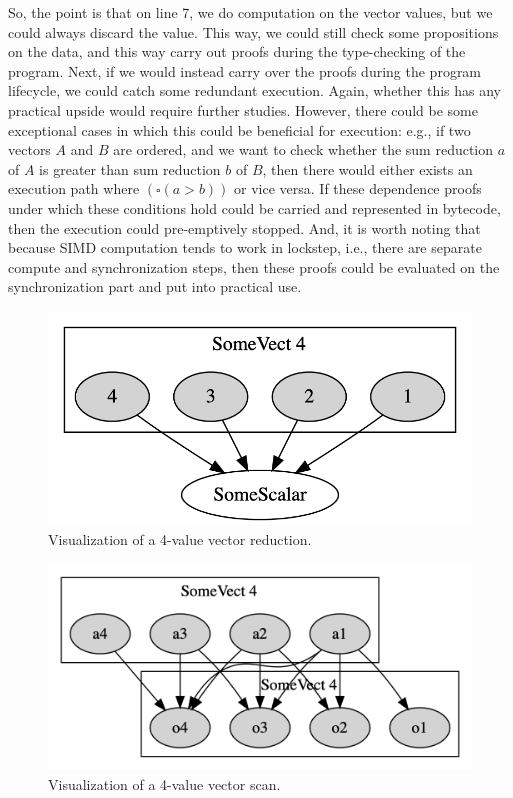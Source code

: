 \documentclass{report}
\begin{document}
So, the point is that on line 7, we do computation on the vector values, but we could always discard the value. This way, we could still check some propositions on the data, and this way carry out proofs during the type-checking of the program. Next, if we would instead carry over the proofs during the program lifecycle, we could catch some redundant execution. Again, whether this has any practical upside would require further studies. However, there could be some exceptional cases in which this could be beneficial for execution: e.g., if two vectors $A$ and $B$ are ordered, and we want to check whether the sum reduction $a$ of $A$ is greater than sum reduction $b$ of $B$, then there would either exists an execution path where $(\square (a>b))$ or vice versa. If these dependence proofs under which these conditions hold could be carried and represented in bytecode, then the execution could pre-emptively stopped. And, it is worth noting that because SIMD computation tends to work in lockstep, i.e., there are separate compute and synchronization steps, then these proofs could be evaluated on the synchronization part and put into practical use.

\begin{figure}
  \centering
  \includegraphics[scale=0.25]{./assets/reduce.png}
  \caption{Visualization of a 4-value vector reduction.}
  \label{fig:reduce}
\end{figure}

\begin{figure}
  \centering
  \includegraphics[scale=0.25]{./assets/scan.png}
  \caption{Visualization of a 4-value vector scan.}
  \label{fig:scan1}
\end{figure}
\end{document}

